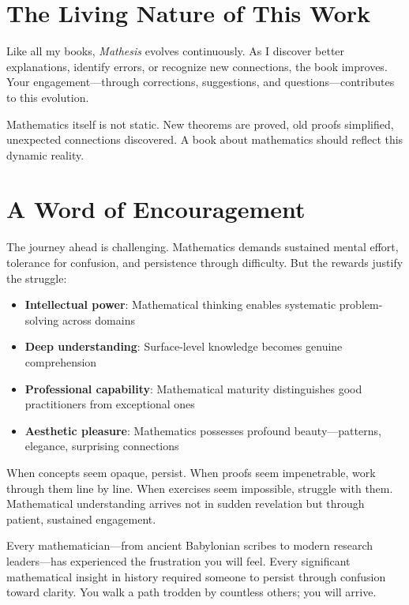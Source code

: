 \section*{The Living Nature of This Work}

Like all my books, \textit{Mathesis} evolves continuously. As I discover better explanations, identify errors, or recognize new connections, the book improves. Your engagement—through corrections, suggestions, and questions—contributes to this evolution.

Mathematics itself is not static. New theorems are proved, old proofs simplified, unexpected connections discovered. A book about mathematics should reflect this dynamic reality.

\section*{A Word of Encouragement}

The journey ahead is challenging. Mathematics demands sustained mental effort, tolerance for confusion, and persistence through difficulty. But the rewards justify the struggle:

\begin{itemize}
    \item \textbf{Intellectual power}: Mathematical thinking enables systematic problem-solving across domains
    \item \textbf{Deep understanding}: Surface-level knowledge becomes genuine comprehension
    \item \textbf{Professional capability}: Mathematical maturity distinguishes good practitioners from exceptional ones
    \item \textbf{Aesthetic pleasure}: Mathematics possesses profound beauty—patterns, elegance, surprising connections
\end{itemize}

When concepts seem opaque, persist. When proofs seem impenetrable, work through them line by line. When exercises seem impossible, struggle with them. Mathematical understanding arrives not in sudden revelation but through patient, sustained engagement.

Every mathematician—from ancient Babylonian scribes to modern research leaders—has experienced the frustration you will feel. Every significant mathematical insight in history required someone to persist through confusion toward clarity. You walk a path trodden by countless others; you will arrive.

